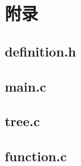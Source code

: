 \documentclass{DateStructure}
\begin{document}
\newpage 
\section{附录}
\subsection{definition.h}

\subsection{main.c}

\subsection{tree.c}

\subsection{function.c}

\end{document}
